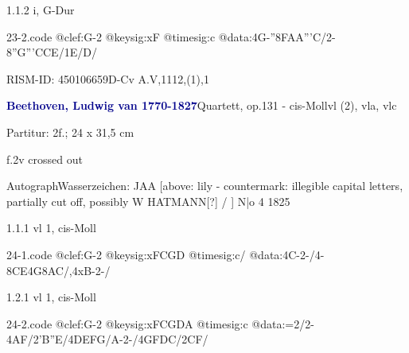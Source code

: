 \documentclass[a4paper, twocolumn, 11pt]{book}
\begin{document}
\newline %
\par 1.1.2  i, G-Dur  
\begin{filecontents*}{23-2.code}
@clef:G-2
@keysig:xF
@timesig:c
@data:4G-''{8FA}{A'''C}/2-8{''G'''C}{CE}/1E/D/
\end{filecontents*}

\newline %
\par RISM-ID: 450106659\newline D-Cv  A.V,1112,(1),1
\par \vspace{16pt} \textcolor{darkblue}{\textbf{Beethoven, Ludwig van  1770-1827}}\hfillplus{[24]}\newline Quartett, op.131 - cis-Moll\newline vl (2), vla, vlc
\par \begin{itshape}\end{itshape} 
\par \textcolor{darkblue}{}  Partitur: 2f.; 24 x 31,5 cm\newline \begin{small} f.2v crossed out\end{small} \newline Autograph\newline Wasserzeichen: JAA [above: lily - countermark: illegible capital letters, partially cut off, possibly {\textquotedbl}W HATMANN{\textquotedbl}[?] / ] N|o 4  1825
\par 1.1.1  vl 1, cis-Moll  
\begin{filecontents*}{24-1.code}
@clef:G-2
@keysig:xFCGD
@timesig:c/
@data:4C-2-/4-{8CE}4G{8AC}/,4xB-2-/
\end{filecontents*}

\newline %
\par 1.2.1  vl 1, cis-Moll  
\begin{filecontents*}{24-2.code}
@clef:G-2
@keysig:xFCGDA
@timesig:c
@data:=2/2-4AF/2'B''E/4DEFG/A-2-/4GFDC/2CF/
\end{filecontents*}
\end{document}
